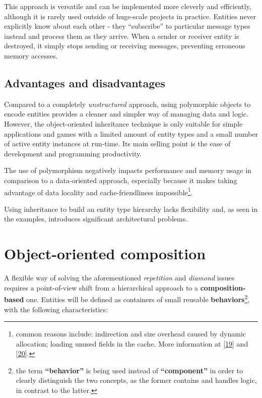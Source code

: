 \documentclass[oneside, 12pt, a4paper, openany]{book}
\begin{document}
This approach is versatile and can be implemented more cleverly and
efficiently, although it is rarely used outside of huge-scale projects
in practice. Entities never explicitly know about each other - they
``subscribe'' to particular message types instead and process them as
they arrive. When a sender or receiver entity is destroyed, it simply
stops sending or receiving messages, preventing erroneous memory
accesses.

\subsection{Advantages and
disadvantages}\label{advantages-and-disadvantages}

Compared to a completely \emph{unstructured} approach, using polymorphic
objects to encode entities provides a cleaner and simpler way of
managing data and logic. However, the object-oriented inheritance
technique is only suitable for simple applications and games with a
limited amount of entity types and a small number of active entity
instances at run-time. Its main selling point is the ease of development
and programming productivity.

The use of polymorphism negatively impacts performance and memory usage
in comparison to a data-oriented approach, especially because it makes
taking advantage of data locality and cache-friendliness
impossible\footnote{common reasons include: indirection and size
  overhead caused by dynamic allocation; loading unused fields in the
  cache. More information at
  {[}\protect\hyperlink{ref-ithare_allocations}{19}{]} and
  {[}\protect\hyperlink{ref-scee_oop_pitfalls}{20}{]}.}.

Using inheritance to build an entity type hierarchy lacks flexibility
and, as seen in the examples, introduces significant architectural
problems.

\section{Object-oriented composition}\label{object-oriented-composition}

A flexible way of solving the aforementioned \emph{repetition} and
\emph{diamond} issues requires a point-of-view shift from a hierarchical
approach to a \textbf{composition-based} one. Entities will be defined
as containers of small reusable \textbf{behaviors}\footnote{the term
  \textbf{``behavior''} is being used instead of \textbf{``component''}
  in order to clearly distinguish the two concepts, as the former
  contains and handles logic, in contrast to the latter.}, with the
following characteristics:
\end{document}
